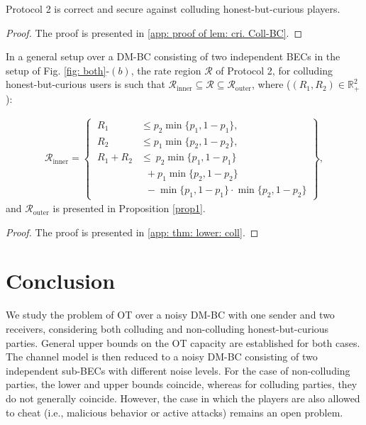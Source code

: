 \documentclass[runningheads]{llncs}
\begin{document}
\begin{lemma}\label{lem: cri. Coll-BC}
    Protocol 2 is correct and secure against colluding honest-but-curious players.
\end{lemma}
\begin{proof}
    The proof is presented in \ref{app: proof of lem: cri. Coll-BC}.
\end{proof}
\begin{proposition}\cite{mishra}\label{prop2}
    In a general setup over a DM-BC consisting of two independent BECs in the setup of Fig. \ref{fig: both}-$(b)$, the rate region $\mathcal{R}$ of Protocol 2, for colluding honest-but-curious users is such that $\mathcal{R}_{\text{inner}}\subseteq\mathcal{R}\subseteq\mathcal{R}_{\text{outer}}$, where ($(R_1, R_2) \in \mathbb{R}_+^2$):
    
\begin{align*}
\mathcal{R}_{\text{inner}} = \left\{\ 
\begin{aligned}
R_1 &\leq p_2 \min\{p_1, 1 - p_1\}, \\
R_2 &\leq p_1 \min\{p_2, 1 - p_2\}, \\
R_1 + R_2 &\leq\ p_2 \min\{p_1, 1 - p_1\} \\
& \,\,\, + p_1 \min\{p_2, 1 - p_2\} \\
& \,\,\,- \min\{p_1, 1 - p_1\} \cdot \min\{p_2, 1 - p_2\}
\end{aligned}
\right\},
\end{align*}
and $\mathcal{R}_{\text{outer}}$ is presented in Proposition \ref{prop1}.
\end{proposition}
\begin{proof}\label{thm: lower: coll}
    The proof is presented in \ref{app: thm: lower: coll}.
\end{proof}
\section{Conclusion}\label{Sec: conc}
We study the problem of OT over a noisy DM-BC with one sender and two receivers, considering both colluding and non-colluding honest-but-curious parties. General upper bounds on the OT capacity are established for both cases. The channel model is then reduced to a noisy DM-BC consisting of two independent sub-BECs with different noise levels. For the case of non-colluding parties, the lower and upper bounds coincide, whereas for colluding parties, they do not generally coincide. However, the case in which the players are also allowed to cheat (i.e., malicious behavior or active attacks) remains an open problem.
\end{document}
